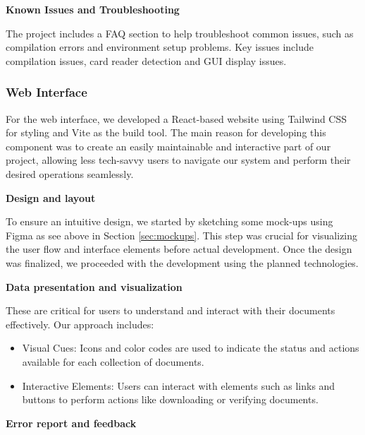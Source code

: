 \documentclass[a4paper,11pt]{article}
\begin{document}
            \vspace{0.25cm}\textbf{Known Issues and Troubleshooting}
            
            The project includes a FAQ section to help troubleshoot common issues, such as compilation errors and environment setup problems. Key issues include compilation issues, card reader detection and GUI display issues.
            
        \subsubsection{Web Interface}
            \quad For the web interface, we developed a React-based website using Tailwind CSS \cite{Tailwind} for styling and Vite \cite{Vite} as the build tool. The main reason for developing this component was to create an easily maintainable and interactive part of our project, allowing less tech-savvy users to navigate our system and perform their desired operations seamlessly.
    
            \vspace{0.25cm}\textbf{Design and layout}
            
            To ensure an intuitive design, we started by sketching some mock-ups using Figma as see above in Section \ref{sec:mockups}. This step was crucial for visualizing the user flow and interface elements before actual development. Once the design was finalized, we proceeded with the development using the planned technologies.
            
            \vspace{0.25cm}\textbf{Data presentation and visualization}
            
            These are critical for users to understand and interact with their documents effectively. Our approach includes:
            \begin{itemize}
                \item Visual Cues: Icons and color codes are used to indicate the status and actions available for each collection of documents.
                \item Interactive Elements: Users can interact with elements such as links and buttons to perform actions like downloading or verifying documents.
            \end{itemize}
            
            \vspace{0.25cm}\textbf{Error report and feedback}
    
\end{document}
